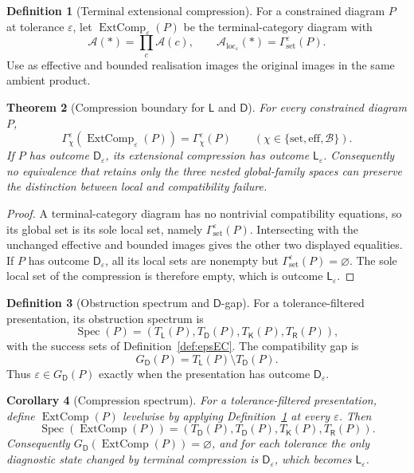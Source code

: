 \documentclass[11pt]{article}
\theoremstyle{plain}
\newtheorem{theorem}{Theorem}[section]
\newtheorem{corollary}[theorem]{Corollary}
\theoremstyle{definition}
\newtheorem{definition}[theorem]{Definition}
\theoremstyle{remark}
\newcommand{\LocalAdm}{\mathcal{A}_{\mathrm{loc}}}
\newcommand{\eps}{\varepsilon}
\begin{document}
\begin{definition}[Terminal extensional compression]
\label{def:extensional-compression}
For a constrained diagram $P$ at tolerance $\eps$, let
$\operatorname{ExtComp}_\eps(P)$ be the terminal-category diagram with
\[
\mathcal A(*)=\prod_c\mathcal A(c),
\qquad
\LocalAdm_\eps(*)=\Gamma_{\mathrm{set}}^\eps(P).
\]
Use as effective and bounded realisation images the original images in the same
ambient product.
\end{definition}

\begin{theorem}[Compression boundary for $\mathsf L$ and $\mathsf D$]
\label{thm:compression-boundary}
For every constrained diagram $P$,
\[
\Gamma_\chi^\eps(\operatorname{ExtComp}_\eps(P))
=\Gamma_\chi^\eps(P)
\qquad
(\chi\in\{\mathrm{set},\mathrm{eff},\mathcal B\}).
\]
If $P$ has outcome $\mathsf D_\eps$, its extensional compression has outcome
$\mathsf L_\eps$. Consequently no equivalence that retains only the three
nested global-family spaces can preserve the distinction between local and
compatibility failure.
\end{theorem}

\begin{proof}
A terminal-category diagram has no nontrivial compatibility equations, so its global
set is its sole local set, namely $\Gamma_{\mathrm{set}}^\eps(P)$. Intersecting
with the unchanged effective and bounded images gives the other two displayed
equalities. If $P$ has outcome $\mathsf D_\eps$, all its local sets are nonempty
but $\Gamma_{\mathrm{set}}^\eps(P)=\varnothing$. The sole local set of the
compression is therefore empty, which is outcome $\mathsf L_\eps$.
\end{proof}

\begin{definition}[Obstruction spectrum and $\mathsf D$-gap]
\label{def:obstruction-spectrum}
For a tolerance-filtered presentation, its obstruction spectrum is
\[
\operatorname{Spec}(P)=
(T_{\mathsf L}(P),T_{\mathsf D}(P),T_{\mathsf K}(P),T_{\mathsf R}(P)),
\]
with the success sets of Definition~\ref{def:epsEC}. The compatibility gap is
\[
G_{\mathsf D}(P)=T_{\mathsf L}(P)\setminus T_{\mathsf D}(P).
\]
Thus $\eps\in G_{\mathsf D}(P)$ exactly when the presentation has outcome
$\mathsf D_\eps$.
\end{definition}

\begin{corollary}[Compression spectrum]
\label{cor:compression-spectrum}
For a tolerance-filtered presentation, define $\operatorname{ExtComp}(P)$
levelwise by applying Definition~\ref{def:extensional-compression} at every
$\eps$. Then
\[
\operatorname{Spec}(\operatorname{ExtComp}(P))=
(T_{\mathsf D}(P),T_{\mathsf D}(P),T_{\mathsf K}(P),T_{\mathsf R}(P)).
\]
Consequently $G_{\mathsf D}(\operatorname{ExtComp}(P))=\varnothing$, and for
each tolerance the only diagnostic state changed by terminal compression is
$\mathsf D_\eps$, which becomes $\mathsf L_\eps$.
\end{corollary}
\end{document}
